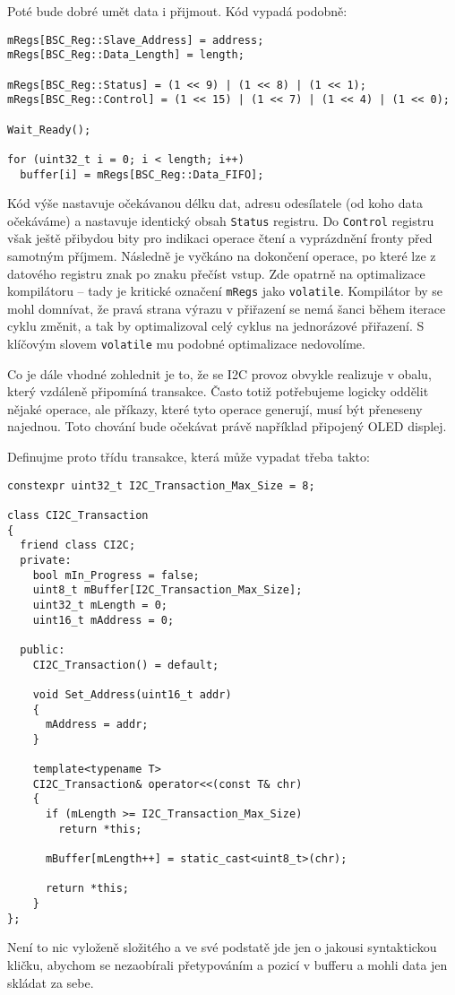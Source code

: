 \documentclass{article}
\begin{document}
Poté bude dobré umět data i přijmout. Kód vypadá podobně:
\begin{lstlisting}
mRegs[BSC_Reg::Slave_Address] = address;
mRegs[BSC_Reg::Data_Length] = length;

mRegs[BSC_Reg::Status] = (1 << 9) | (1 << 8) | (1 << 1);
mRegs[BSC_Reg::Control] = (1 << 15) | (1 << 7) | (1 << 4) | (1 << 0);

Wait_Ready();

for (uint32_t i = 0; i < length; i++)
  buffer[i] = mRegs[BSC_Reg::Data_FIFO];
\end{lstlisting}
Kód výše nastavuje očekávanou délku dat, adresu odesílatele (od koho data očekáváme) a nastavuje identický obsah \texttt{Status} registru. Do \texttt{Control} registru však ještě přibydou bity pro indikaci operace čtení a vyprázdnění fronty před samotným příjmem. Následně je vyčkáno na dokončení operace, po které lze z datového registru znak po znaku přečíst vstup. Zde opatrně na optimalizace kompilátoru -- tady je kritické označení \texttt{mRegs} jako \texttt{volatile}. Kompilátor by se mohl domnívat, že pravá strana výrazu v přiřazení se nemá šanci během iterace cyklu změnit, a tak by optimalizoval celý cyklus na jednorázové přiřazení. S klíčovým slovem \texttt{volatile} mu podobné optimalizace nedovolíme.

Co je dále vhodné zohlednit je to, že se I2C provoz obvykle realizuje v obalu, který vzdáleně připomíná transakce. Často totiž potřebujeme logicky oddělit nějaké operace, ale příkazy, které tyto operace generují, musí být přeneseny najednou. Toto chování bude očekávat právě například připojený OLED displej.

Definujme proto třídu transakce, která může vypadat třeba takto:
\begin{lstlisting}
constexpr uint32_t I2C_Transaction_Max_Size = 8;

class CI2C_Transaction
{
  friend class CI2C;
  private:
    bool mIn_Progress = false;
    uint8_t mBuffer[I2C_Transaction_Max_Size];
    uint32_t mLength = 0;
    uint16_t mAddress = 0;

  public:
    CI2C_Transaction() = default;

    void Set_Address(uint16_t addr)
    {
      mAddress = addr;
    }

    template<typename T>
    CI2C_Transaction& operator<<(const T& chr)
    {
      if (mLength >= I2C_Transaction_Max_Size)
        return *this;

      mBuffer[mLength++] = static_cast<uint8_t>(chr);

      return *this;
    }
};
\end{lstlisting}
Není to nic vyloženě složitého a ve své podstatě jde jen o jakousi syntaktickou kličku, abychom se nezaobírali přetypováním a pozicí v bufferu a mohli data jen skládat za sebe.
\end{document}

